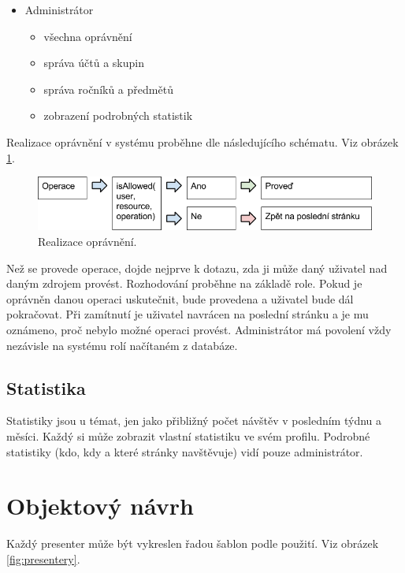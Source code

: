 \documentclass[thesis=B,czech]{FITthesis}[2012/06/26]
\begin{document}
\begin{itemize}
	\item Administrátor
	\begin{itemize}
		\item všechna oprávnění
		\item správa účtů a skupin
		\item správa ročníků a předmětů
		\item zobrazení podrobných statistik
	\end{itemize}
\end{itemize}

Realizace oprávnění v systému proběhne dle následujícího schématu. Viz obrázek \ref{fig:permission}.

\begin{figure}
  \centering
	\includegraphics[scale=0.45]{realizace_opravneni.png}
	\caption{Realizace oprávnění.} \label{fig:permission} 
\end{figure}

Než se provede operace, dojde nejprve k dotazu, zda ji může daný uživatel nad daným zdrojem provést. Rozhodování proběhne na základě role. Pokud je oprávněn danou operaci uskutečnit, bude provedena a uživatel bude dál pokračovat. Při zamítnutí je uživatel navrácen na poslední stránku a je mu oznámeno, proč nebylo možné operaci provést. Administrátor má povolení vždy nezávisle na systému rolí načítaném z databáze.

\subsection{Statistika}

Statistiky jsou u témat, jen jako přibližný počet návštěv v posledním týdnu a měsíci. Každý si může zobrazit vlastní statistiku ve svém profilu. Podrobné statistiky (kdo, kdy a které stránky navštěvuje) vidí pouze administrátor.


\section{Objektový návrh}
Každý presenter může být vykreslen řadou šablon podle použití. Viz obrázek \ref{fig:presentery}.
\end{document}
